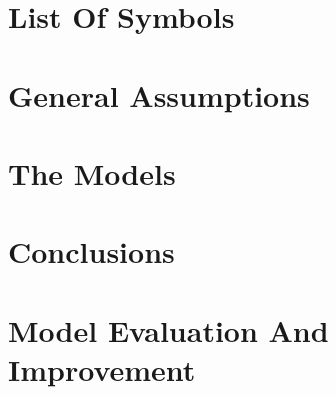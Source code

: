 \documentclass{mcmthesis}
\begin{document}
\begin{spacing}{1}
\section{List Of Symbols}
  

\section{General Assumptions}
  

\section{The Models}
  

\section{Conclusions}
  

\section{Model Evaluation And Improvement}
  


\newpage
\end{spacing} 


\end{document}

